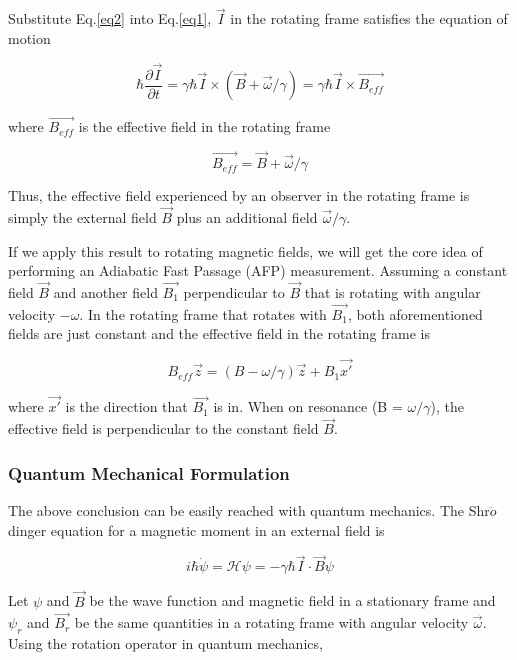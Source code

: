 Substitute Eq.\@ \ref{eq2} into Eq.\@ \ref{eq1}, $\vec{I}$ in the rotating frame satisfies the equation of motion 

\begin{equation}
\hbar \frac{\partial \vec{I}}{\partial t}=\gamma \hbar \vec{I} \times (\vec{B} + \vec{\omega}/\gamma)=\gamma \hbar \vec{I} \times \vec{B_{eff}}
\end{equation}

where $\vec{B_{eff}}$ is the effective field in the rotating frame

\begin{equation}
\vec{B_{eff}}=\vec{B} + \vec{\omega}/\gamma
\end{equation}

Thus, the effective field experienced by an observer in the rotating frame is simply the external field $\vec{B}$ plus an additional field $\vec{\omega}/\gamma$.

If we apply this result to rotating magnetic fields, we will get the core idea of performing an Adiabatic Fast Passage (AFP) measurement. Assuming a constant field $\vec{B}$ and another field $\vec{B_{1}}$ perpendicular to $\vec{B}$ that is rotating with angular velocity $-\omega$. In the rotating frame that rotates with $\vec{B_{1}}$, both aforementioned fields are just constant and the effective field in the rotating frame is

\begin{equation}\label{EffectiveField}
B_{eff}\vec{z}=(B-\omega/\gamma)\vec{z} + B_{1}\vec{x'}
\end{equation}

where $\vec{x'}$ is the direction that $\vec{B_{1}}$ is in. When on resonance (B = $\omega/\gamma$), the effective field is perpendicular to the constant field $\vec{B}$.

\subsubsection{Quantum Mechanical Formulation}

The above conclusion can be easily reached with quantum mechanics. The Shr$\ddot{o}$dinger equation for a magnetic moment in an external field is

\begin{equation}\label{eq3}
i\hbar \dot{\psi}=\mathcal{H} \psi=-\gamma \hbar \vec{I}\cdot \vec{B} \psi
\end{equation}

Let $\psi$ and $\vec{B}$ be the wave function and magnetic field in a stationary frame and $\psi_{r}$ and $\vec{B_{r}}$ be the same quantities in a rotating frame with angular velocity $\vec{\omega}$. Using the rotation operator in quantum mechanics, 

